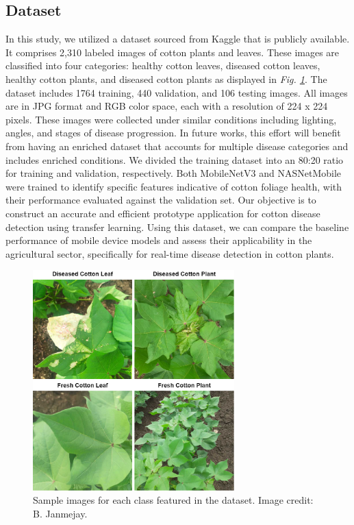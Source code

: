 \documentclass[conference]{IEEEtran}
\begin{document}
\subsection{Dataset}
In this study, we utilized a dataset sourced from Kaggle \cite{Kaggle} that is publicly available. It comprises 2,310 labeled images of cotton plants and leaves. These images are classified into four categories: healthy cotton leaves, diseased cotton leaves, healthy cotton plants, and diseased cotton plants as displayed in \emph{Fig. \ref{CottonImages}}. The dataset includes 1764 training, 440 validation, and 106 testing images. All images are in JPG format and RGB color space, each with a resolution of 224 x 224 pixels. These images were collected under similar conditions including lighting, angles, and stages of disease progression. In future works, this effort will benefit from having an enriched dataset that accounts for multiple disease categories and includes enriched conditions. We divided the training dataset into an 80:20 ratio for training and validation, respectively. Both MobileNetV3 and NASNetMobile were trained to identify specific features indicative of cotton foliage health, with their performance evaluated against the validation set. Our objective is to construct an accurate and efficient prototype application for cotton disease detection using transfer learning. Using this dataset, we can compare the baseline performance of mobile device models and assess their applicability in the agricultural sector, specifically for real-time disease detection in cotton plants.

\begin{figure}[h]
\centerline{\includegraphics[height=8.5cm, width=.9\linewidth]{Images/cotton images.drawio.png}}
\caption{Sample images for each class featured in the dataset. Image credit: B. Janmejay.}
\label{CottonImages}
\end{figure}
\end{document}
